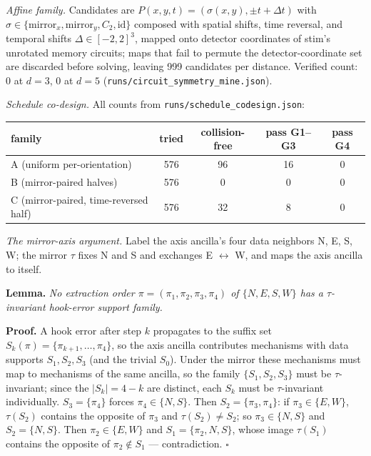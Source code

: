 \documentclass[11pt]{article}
\begin{document}
\emph{Affine family.} Candidates are
$P(x, y, t) = (\sigma(x, y), \pm t + \Delta t)$ with
$\sigma \in \{\mathrm{mirror}_x, \mathrm{mirror}_y, C_2, \mathrm{id}\}$
composed with spatial shifts, time reversal, and temporal shifts
$\Delta \in [-2, 2]^3$, mapped onto detector coordinates of stim's unrotated
memory circuits; maps that fail to permute the detector-coordinate set are
discarded before solving, leaving 999 candidates per distance. Verified
count: 0 at $d = 3$, 0 at $d = 5$
(\texttt{runs/circuit\_symmetry\_mine.json}).

\emph{Schedule co-design.} All counts from
\texttt{runs/schedule\_codesign.json}:

\begin{center}
\begin{tabular}{lcccc}
\toprule
family & tried & collision-free & pass G1--G3 & pass G4 \\
\midrule
A (uniform per-orientation) & 576 & 96 & 16 & 0 \\
B (mirror-paired halves) & 576 & 0 & 0 & 0 \\
C (mirror-paired, time-reversed half) & 576 & 32 & 8 & 0 \\
\bottomrule
\end{tabular}
\end{center}

\emph{The mirror-axis argument.} Label the axis ancilla's four data
neighbors N, E, S, W; the mirror $\tau$ fixes N and S and exchanges
E $\leftrightarrow$ W, and maps the axis ancilla to itself.

\medskip
\noindent\textbf{Lemma.} \emph{No extraction order
$\pi = (\pi_1, \pi_2, \pi_3, \pi_4)$ of $\{N,E,S,W\}$ has a
$\tau$-invariant hook-error support family.}

\smallskip
\noindent\textbf{Proof.} A hook error after step $k$ propagates to the
suffix set $S_k(\pi) = \{\pi_{k+1}, \ldots, \pi_4\}$, so the axis ancilla
contributes mechanisms with data supports $S_1, S_2, S_3$ (and the trivial
$S_0$). Under the mirror these mechanisms must map to mechanisms of the
same ancilla, so the family $\{S_1, S_2, S_3\}$ must be $\tau$-invariant;
since the $|S_k| = 4 - k$ are distinct, each $S_k$ must be $\tau$-invariant
individually. $S_3 = \{\pi_4\}$ forces $\pi_4 \in \{N, S\}$. Then
$S_2 = \{\pi_3, \pi_4\}$: if $\pi_3 \in \{E, W\}$, $\tau(S_2)$ contains the
opposite of $\pi_3$ and $\tau(S_2) \neq S_2$; so $\pi_3 \in \{N, S\}$ and
$S_2 = \{N, S\}$. Then $\pi_2 \in \{E, W\}$ and
$S_1 = \{\pi_2, N, S\}$, whose image $\tau(S_1)$ contains the opposite of
$\pi_2 \notin S_1$ --- contradiction. $\square$
\end{document}
